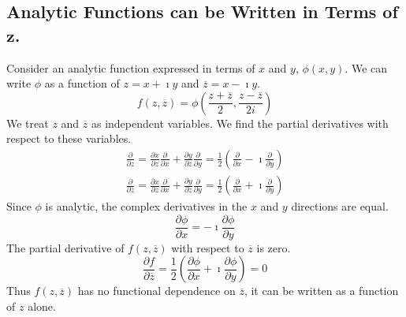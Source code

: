 \subsection{Analytic Functions can be Written in Terms of $\mathbf{z}$.}
Consider an analytic function expressed in terms of $x$ and $y$, $\phi(x, y)$.
We can write $\phi$ as a function of $z = x + \imath y$ and $\overline{z} = x - \imath y$.
\[
f \left( z, \overline{z} \right) 
= \phi \left( \frac{z + \overline{z}}{2}, \frac{z - \overline{z}}{2i} \right)
\]
We treat $z$ and $\overline{z}$ as independent variables.  We find the 
partial derivatives with respect to these variables.
\begin{gather*}
  \frac{\partial}{\partial z} = \frac{\partial x}{\partial z} \frac{\partial}{\partial x} 
  + \frac{\partial y}{\partial z} \frac{\partial }{\partial y}
  = \frac{1}{2} \left( \frac{\partial}{\partial x} - \imath \frac{\partial}{\partial y} \right) 
  \\
  \frac{\partial}{\partial \overline{z}} 
  = \frac{\partial x}{\partial \overline{z}} \frac{\partial}{\partial x} 
  + \frac{\partial y}{\partial \overline{z}} \frac{\partial}{\partial y}
  = \frac{1}{2} \left( \frac{\partial}{\partial x} + \imath \frac{\partial}{\partial y} \right)
\end{gather*}
Since $\phi$ is analytic, the complex derivatives in the $x$ and $y$ directions
are equal.
\[
\frac{\partial \phi}{\partial x} = - \imath \frac{\partial \phi}{\partial y}
\]
The partial derivative of $f\left( z,\overline{z} \right)$ 
with respect to $\overline{z}$ is zero.
\[
\frac{\partial f}{\partial \overline{z}} 
= \frac{1}{2} \left( \frac{\partial \phi}{\partial x} + \imath \frac{\partial \phi}{\partial y} \right)
= 0
\]
Thus $f\left( z,\overline{z} \right)$ has no functional dependence 
on $\overline{z}$, it can be written as a function of $z$ alone.

